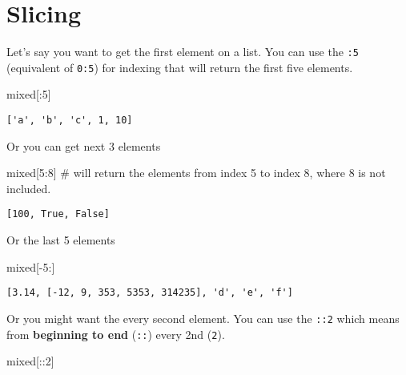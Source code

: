 \documentclass[
  letterpaper,
  DIV=11,
  numbers=noendperiod]{scrreprt}
\newenvironment{Shaded}{\begin{snugshade}}{\end{snugshade}}
\newcommand{\CommentTok}[1]{\textcolor[rgb]{0.37,0.37,0.37}{#1}}
\newcommand{\DecValTok}[1]{\textcolor[rgb]{0.68,0.00,0.00}{#1}}
\newcommand{\NormalTok}[1]{\textcolor[rgb]{0.00,0.23,0.31}{#1}}
\newcommand{\OperatorTok}[1]{\textcolor[rgb]{0.37,0.37,0.37}{#1}}
\begin{document}
\section{Slicing}\label{slicing}

Let's say you want to get the first element on a list. You can use the
\texttt{:5} (equivalent of \texttt{0:5}) for indexing that will return
the first five elements.

\begin{Shaded}
\begin{Highlighting}[]
\NormalTok{mixed[:}\DecValTok{5}\NormalTok{]}
\end{Highlighting}
\end{Shaded}

\begin{verbatim}
['a', 'b', 'c', 1, 10]
\end{verbatim}

Or you can get next 3 elements

\begin{Shaded}
\begin{Highlighting}[]
\NormalTok{mixed[}\DecValTok{5}\NormalTok{:}\DecValTok{8}\NormalTok{] }\CommentTok{\# will return the elements from index 5 to index 8, where 8 is not included.}
\end{Highlighting}
\end{Shaded}

\begin{verbatim}
[100, True, False]
\end{verbatim}

Or the last 5 elements

\begin{Shaded}
\begin{Highlighting}[]
\NormalTok{mixed[}\OperatorTok{{-}}\DecValTok{5}\NormalTok{:]}
\end{Highlighting}
\end{Shaded}

\begin{verbatim}
[3.14, [-12, 9, 353, 5353, 314235], 'd', 'e', 'f']
\end{verbatim}

Or you might want the every second element. You can use the \texttt{::2}
which means from \textbf{beginning to end} (\texttt{::}) every 2nd
(\texttt{2}).

\begin{Shaded}
\begin{Highlighting}[]
\NormalTok{mixed[::}\DecValTok{2}\NormalTok{]}
\end{Highlighting}
\end{Shaded}
\end{document}
